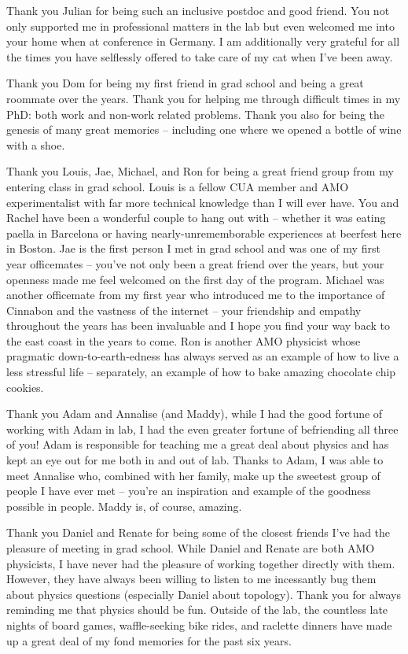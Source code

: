 Thank you Julian for being such an inclusive postdoc and good friend. You not only supported me in professional matters in the lab but even welcomed me into your home when at conference in Germany. I am additionally very grateful for all the times you have selflessly offered to take care of my cat when I've been away. 

Thank you Dom for being my first friend in grad school and being a great roommate over the years. Thank you for helping me through difficult times in my PhD: both work and non-work related problems. Thank you also for being the genesis of many great memories -- including one where we opened a bottle of wine with a shoe.

Thank you Louis, Jae, Michael, and Ron for being a great friend group from my entering class in grad school. Louis is a fellow CUA member and AMO experimentalist with far more technical knowledge than I will ever have. You and Rachel have been a wonderful couple to hang out with -- whether it was eating paella in Barcelona or having nearly-unrememborable experiences at beerfest here in Boston. Jae is the first person I met in grad school and was one of my first year officemates -- you've not only been a great friend over the years, but your openness made me feel welcomed on the first day of the program. Michael was another officemate from my first year who introduced me to the importance of Cinnabon and the vastness of the internet -- your friendship and empathy throughout the years has been invaluable and I hope you find your way back to the east coast in the years to come. Ron is another AMO physicist whose pragmatic down-to-earth-edness has always served as an example of how to live a less stressful life -- separately, an example of how to bake amazing chocolate chip cookies.

Thank you Adam and Annalise (and Maddy), while I had the good fortune of working with Adam in lab, I had the even greater fortune of befriending all three of you! Adam is responsible for teaching me a great deal about physics and has kept an eye out for me both in and out of lab. Thanks to Adam, I was able to meet Annalise who, combined with her family, make up the sweetest group of people I have ever met -- you're an inspiration and example of the goodness possible in people. Maddy is, of course, amazing.

Thank you Daniel and Renate for being some of the closest friends I've had the pleasure of meeting in grad school. While Daniel and Renate are both AMO physicists, I have never had the pleasure of working together directly with them. However, they have always been willing to listen to me incessantly bug them about physics questions (especially Daniel about topology). Thank you for always reminding me that physics should be fun. Outside of the lab, the countless late nights of board games, waffle-seeking bike rides, and raclette dinners have made up a great deal of my fond memories for the past six years.

